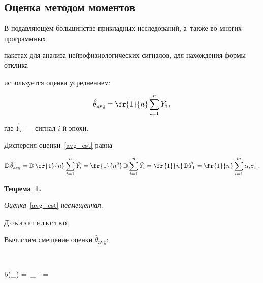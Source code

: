 \subsection{Оценка методом моментов}





В подавляющем большинстве прикладных исследований, а~так\-же во многих программных 


пакетах для анализа нейрофизиологических сигналов, для нахождения формы отклика 


используется оценка усреднением:


\begin{equation}


\label{avg_est}


\hat{\theta}_{\mathrm{avg}} = \fr{1}{n}\sum\limits^n_{i=1}\tilde{Y_i}\,,


\end{equation}


где $\tilde{Y_i}$~--- сигнал $i$-й эпохи.


Дисперсия оценки~\eqref{avg_est} равна


$$


\mathbb{D}\,\hat{\theta}_{\mathrm{avg}} = 


\mathbb{D}\,\fr{1}{n}\sum\limits^n_{i=1}\tilde{Y_i} = 


\fr{1}{n^2}\,\mathbb{D}\sum\limits^n_{i=1}\tilde{Y_i} = 


\fr{1}{n}\,\mathbb{D}\tilde{Y_1} = 


\fr{1}{n}\sum\limits_{i=1}^m\alpha_i\sigma_i\,.


$$





\noindent


\textbf{Теорема~1.}


\textit{Оценка}~\eqref{avg_est} \textit{несмещенная}. %








\smallskip





\noindent


Д\,о\,к\,а\,з\,а\,т\,е\,л\,ь\,с\,т\,в\,о\,.\ \ 


Вычислим смещение оценки $\hat{\theta}_{\mathrm{avg}}$:


$$


b(\hat{\theta}_{}) = \,\hat{\theta}_{} - \theta = 


